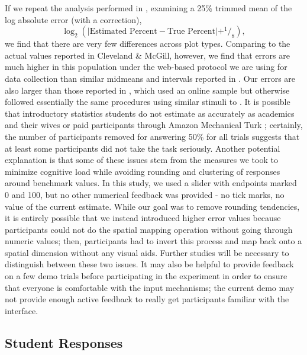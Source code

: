 \documentclass[runningheads
]{llncs}
\begin{document}
If we repeat the analysis performed in
\textcite{clevelandGraphicalPerceptionTheory1984}, examining a 25\%
trimmed mean of the log absolute error (with a correction),
\[\log_2\left(\left| \text{Estimated Percent} - \text{True Percent}\right| + ^1\!\!/_8\right),\]
we find that there are very few differences across plot types. Comparing
to the actual values reported in Cleveland \& McGill, however, we find
that errors are much higher in this population under the web-based
protocol we are using for data collection than similar midmeans and
intervals reported in \textcite{clevelandGraphicalPerceptionTheory1984}.
Our errors are also larger than those reported in
\textcite{heerCrowdsourcingGraphicalPerception2010}, which used an
online sample but otherwise followed essentially the same procedures
using similar stimuli to
\textcite{clevelandGraphicalPerceptionTheory1984}. It is possible that
introductory statistics students do not estimate as accurately as
academics and their wives
\autocite{clevelandGraphicalPerceptionTheory1984} or paid participants
through Amazon Mechanical Turk
\autocite{heerCrowdsourcingGraphicalPerception2010}; certainly, the
number of participants removed for answering 50\% for all trials
suggests that at least some participants did not take the task
seriously. Another potential explanation is that some of these issues
stem from the measures we took to minimize cognitive load while avoiding
rounding and clustering of responses around benchmark values. In this
study, we used a slider with endpoints marked 0 and 100, but no other
numerical feedback was provided - no tick marks, no value of the current
estimate. While our goal was to remove rounding tendencies, it is
entirely possible that we instead introduced higher error values because
participants could not do the spatial mapping operation without going
through numeric values; then, participants had to invert this process
and map back onto a spatial dimension without any visual aids. Further
studies will be necessary to distinguish between these two issues. It
may also be helpful to provide feedback on a few demo trials before
participating in the experiment in order to ensure that everyone is
comfortable with the input mechanisms; the current demo may not provide
enough active feedback to really get participants familiar with the
interface.

\subsection{Student Responses}\label{student-responses}
\end{document}
